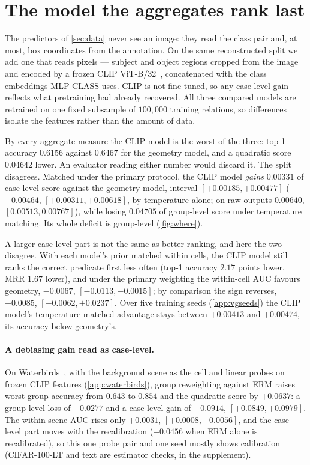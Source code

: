 \section{The model the aggregates rank last}\label{sec:vgvisual}

The predictors of \cref{sec:data} never see an image: they read the class pair and, at most,
box coordinates from the annotation. On the same reconstructed split we add one that reads pixels --- subject and object
regions cropped from the image and encoded by a frozen CLIP ViT-B/32~\cite{radford2021learning},
concatenated with the class embeddings MLP-CLASS uses. CLIP is not fine-tuned, so any
case-level gain reflects what pretraining had already recovered. All three compared models
are retrained on one fixed subsample of $100{,}000$ training relations, so differences isolate
the features rather than the amount of data.

By every aggregate measure the CLIP model is the worst of the three: top-1 accuracy $0.6156$
against $0.6467$ for the geometry model, and a quadratic score $0.04642$ lower. An evaluator
reading either number would discard it. The split disagrees. Matched under the primary
protocol, the CLIP model \emph{gains} $0.00331$ of case-level score against the geometry
model, interval $[+0.00185,+0.00477]$ ($+0.00464$, $[+0.00311,+0.00618]$, by temperature
alone; on raw outputs $0.00640$, $[0.00513,0.00767]$), while losing $0.04705$ of group-level
score under temperature matching. Its whole deficit is group-level (\cref{fig:where}).

A larger case-level part is not the same as better ranking, and here the two disagree. With
each model's prior matched within cells, the CLIP model still ranks the correct predicate
first less often (top-1 accuracy $2.17$ points lower, MRR $1.67$ lower), and under the primary
weighting the within-cell AUC favours geometry, $-0.0067$, $[-0.0113,-0.0015]$; by comparison
the sign reverses, $+0.0085$, $[-0.0062,+0.0237]$. Over five training seeds
(\cref{app:vgseeds}) the CLIP model's temperature-matched advantage stays between $+0.00413$ and
$+0.00474$, its accuracy below geometry's.

\paragraph{A debiasing gain read as case-level.}\label{sec:further} On
Waterbirds~\cite{sagawa2020distributionally}, with the background scene as the cell and linear
probes on frozen CLIP features (\cref{app:waterbirds}), group reweighting against ERM raises
worst-group accuracy from $0.643$ to $0.854$ and the quadratic score by $+0.0637$: a
group-level loss of $-0.0277$ and a case-level gain of $+0.0914$, $[+0.0849,+0.0979]$. The
within-scene AUC rises only $+0.0031$, $[+0.0008,+0.0056]$, and the case-level part moves with
the recalibration ($-0.0456$ when ERM alone is recalibrated), so this one probe pair and one seed
mostly shows calibration (CIFAR-100-LT and text are estimator checks, in the supplement).
